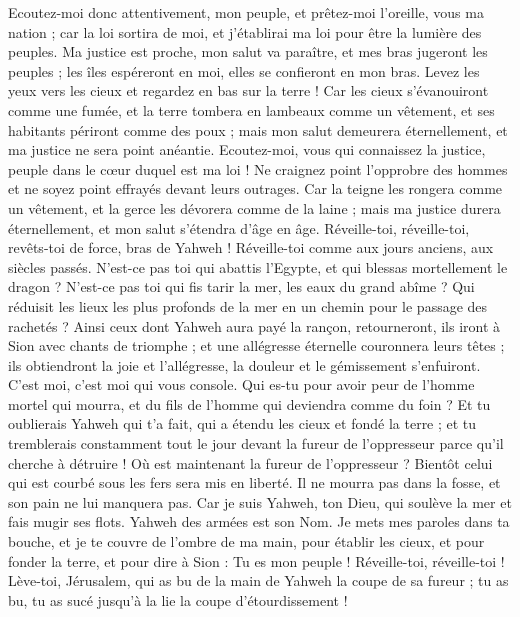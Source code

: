 \begin{multicols}{2}
Ecoutez-moi donc attentivement, mon peuple, et prêtez-moi l'oreille, vous ma nation ; car la loi sortira de moi, et j'établirai ma loi pour être la lumière des peuples.
Ma justice est proche, mon salut va paraître, et mes bras jugeront les peuples ; les îles espéreront en moi, elles se confieront en mon bras.
Levez les yeux vers les cieux et regardez en bas sur la terre ! Car les cieux s'évanouiront comme une fumée, et la terre tombera en lambeaux comme un vêtement, et ses habitants périront comme des poux ; mais mon salut demeurera éternellement, et ma justice ne sera point anéantie.
Ecoutez-moi, vous qui connaissez la justice, peuple dans le cœur duquel est ma loi ! Ne craignez point l'opprobre des hommes et ne soyez point effrayés devant leurs outrages.
Car la teigne les rongera comme un vêtement, et la gerce les dévorera comme de la laine ; mais ma justice durera éternellement, et mon salut s'étendra d'âge en âge.
Réveille-toi, réveille-toi, revêts-toi de force, bras de Yahweh ! Réveille-toi comme aux jours anciens, aux siècles passés. N'est-ce pas toi qui abattis l'Egypte, et qui blessas mortellement le dragon ?
N'est-ce pas toi qui fis tarir la mer, les eaux du grand abîme ? Qui réduisit les lieux les plus profonds de la mer en un chemin pour le passage des rachetés ?
Ainsi ceux dont Yahweh aura payé la rançon, retourneront, ils iront à Sion avec chants de triomphe ; et une allégresse éternelle couronnera leurs têtes ; ils obtiendront la joie et l'allégresse, la douleur et le gémissement s'enfuiront.
C'est moi, c'est moi qui vous console. Qui es-tu pour avoir peur de l'homme mortel qui mourra, et du fils de l'homme qui deviendra comme du foin ?
Et tu oublierais Yahweh qui t'a fait, qui a étendu les cieux et fondé la terre ; et tu tremblerais constamment tout le jour devant la fureur de l'oppresseur parce qu'il cherche à détruire ! Où est maintenant la fureur de l'oppresseur ?
Bientôt celui qui est courbé sous les fers sera mis en liberté. Il ne mourra pas dans la fosse, et son pain ne lui manquera pas.
Car je suis Yahweh, ton Dieu, qui soulève la mer et fais mugir ses flots. Yahweh des armées est son Nom.
Je mets mes paroles dans ta bouche, et je te couvre de l'ombre de ma main, pour établir les cieux, et pour fonder la terre, et pour dire à Sion : Tu es mon peuple !
Réveille-toi, réveille-toi ! Lève-toi, Jérusalem, qui as bu de la main de Yahweh la coupe de sa fureur ; tu as bu, tu as sucé jusqu'à la lie la coupe d'étourdissement !

\end{multicols}

